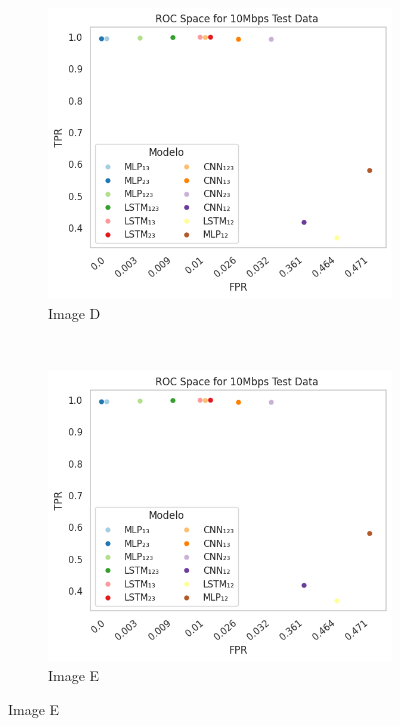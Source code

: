 \documentclass[a4paper,fleqn]{cas-sc}
\begin{document}
\begin{figure}
\begin{minipage}[t]{0.46\textwidth}
			\begin{subfigure}[t]{0.33\textwidth}
				\includegraphics[draft=false, width=\textwidth]{./figs/ROC-Space-Test-Data-10Mbps.png} 
				\caption{Image D}
				\label{fig:1a}
			\end{subfigure}%
			~
			\begin{subfigure}[t]{0.33\textwidth}
				\includegraphics[draft=false, width=\textwidth]{./figs/ROC-Space-Test-Data-10Mbps.png} 
				\caption{Image E}
				\label{fig:2a}
			\end{subfigure}%

\end{minipage}
\end{figure}
\end{document}
